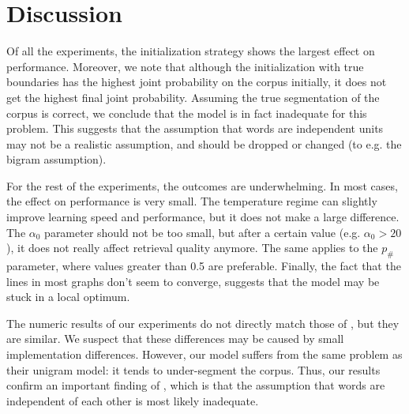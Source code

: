 \section{Discussion}

Of all the experiments, the initialization strategy shows the largest effect on performance. Moreover, we note that although the initialization with true boundaries has the highest joint probability on the corpus initially, it does not get the highest final joint probability. Assuming the true segmentation of the corpus is correct, we conclude that the model is in fact inadequate for this problem. This suggests that the assumption that words are independent units may not be a realistic assumption, and should be dropped or changed (to e.g. the bigram assumption).

For the rest of the experiments, the outcomes are underwhelming. In most cases, the effect on performance is very small. The temperature regime can slightly improve learning speed and performance, but it does not make a large difference. The $\alpha_0$ parameter should not be too small, but after a certain value (e.g. $\alpha_0 > 20$), it does not really affect retrieval quality anymore. The same applies to the $p_\#$ parameter, where values greater than 0.5 are preferable. Finally, the fact that the lines in most graphs don't seem to converge, suggests that the model may be stuck in a local optimum.

The numeric results of our experiments do not directly match those of \cite{Goldwater200921}, but they are similar. We suspect that these differences may be caused by small implementation differences. However, our model suffers from the same problem as their unigram model: it tends to under-segment the corpus. Thus, our results confirm an important finding of \cite{Goldwater200921}, which is that the assumption that words are independent of each other is most likely inadequate.

